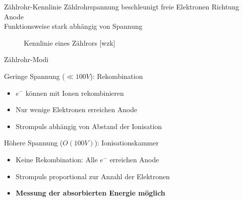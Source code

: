 \documentclass{beamer}
\begin{document}

\begin{frame}{Zählrohr-Kennlinie}
	Zählrohrspannung beschleunigt freie Elektronen Richtung Anode \\
	Funktionsweise stark abhängig von Spannung
	
	\begin{figure}[htbp]
	  \centering
	  
	  \caption{Kennlinie eines Zählrors [wzk]}
	\end{figure}
	
\end{frame}	


\begin{frame}{Zählrohr-Modi}
	\begin{block}{Geringe Spannung ($\ll 100V$): Rekombination}
		\begin{itemize}
		  	\item $e^-$ können mit Ionen rekombinieren
		  	\item Nur wenige Elektronen erreichen Anode
		  	\item Strompuls abhängig von Abstand der Ionisation
		\end{itemize}
	\end{block}
	
	\begin{block}{Höhere Spannung ($O(100V)$): Ionisationskammer}
		\begin{itemize}
		  	\item Keine Rekombination: Alle $e^-$ erreichen Anode
		  	\item Strompuls proportional zur Anzahl der Elektronen
			\item \textbf{Messung der absorbierten Energie möglich}
		\end{itemize}
	\end{block}
	
\end{frame}
\end{document}
